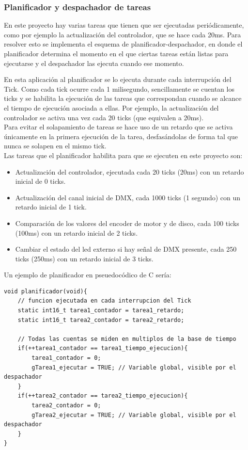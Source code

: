 \subsubsection{Planificador y despachador de tareas}
En este proyecto hay varias tareas que tienen que ser ejecutadas periódicamente, como por ejemplo la actualización del controlador, que se hace cada 20ms. Para resolver esto se implementa el esquema de planificador-despachador, en donde el planificador determina el momento en el que ciertas tareas están listas para ejecutarse y el despachador las ejecuta cuando ese momento.

En esta aplicación al planificador se lo ejecuta durante cada interrupción del Tick. Como cada tick ocurre cada 1 milisegundo, sencillamente se cuentan los ticks y se habilita la ejecución de las tareas que correspondan cuando se alcance el tiempo de ejecución asociada a ellas. Por ejemplo, la actualización del controlador se activa una vez cada 20 ticks (que equivalen a 20ms).\\
Para evitar el solapamiento de tareas se hace uso de un retardo que se activa únicamente en la primera ejecución de la tarea, desfasándolas de forma tal que nunca se solapen en el mismo tick. \\
Las tareas que el planificador habilita para que se ejecuten en este proyecto son:
\begin{itemize}
	\item Actualización del controlador, ejecutada cada 20 ticks (20ms) con un retardo inicial de 0 ticks.
	\item Actualización del canal inicial de DMX, cada 1000 ticks (1 segundo) con un retardo inicial de 1 tick.
	\item Comparación de los valores del encoder de motor y de disco, cada 100 ticks (100ms) con un retardo inicial de 2 ticks.
	\item Cambiar el estado del led externo si hay señal de DMX presente, cada 250 ticks (250ms) con un retardo inicial de 3 ticks.
\end{itemize}
Un ejemplo de planificador en pseuedocódico de C sería:
\begin{lstlisting}[style=CStyle]
void planificador(void){
	// funcion ejecutada en cada interrupcion del Tick
	static int16_t tarea1_contador = tarea1_retardo;
	static int16_t tarea2_contador = tarea2_retardo;
	
	// Todas las cuentas se miden en multiplos de la base de tiempo
	if(++tarea1_contador == tarea1_tiempo_ejecucion){
		tarea1_contador = 0;
		gTarea1_ejecutar = TRUE; // Variable global, visible por el despachador
	}
	if(++tarea2_contador == tarea2_tiempo_ejecucion){
		tarea2_contador = 0;
		gTarea2_ejecutar = TRUE; // Variable global, visible por el despachador
	}
}
\end{lstlisting}

